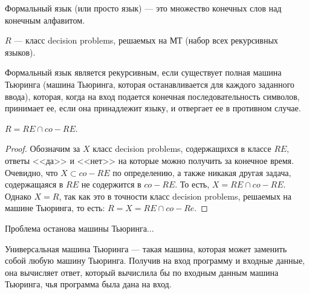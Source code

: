     \begin{Def}
        Формальный язык (или просто язык) --- это множество конечных слов над конечным алфавитом.
    \end{Def}
    \begin{Def}[Класс $R$]
        $R$ --- класс decision problems, решаемых на МТ (набор всех рекурсивных языков). 
    \end{Def}
    \begin{Def} Формальный язык является рекурсивным, если            существует полная машина Тьюринга (машина Тьюринга, которая останавливается для    каждого заданного ввода), которая, когда на вход подается конечная                  последовательность символов, принимает ее, если она принадлежит языку, и отвергает    ее в противном случае. 
    \end{Def}
    \begin{Thm}
        $R = RE \cap co-RE$.
    \end{Thm}
    \begin{proof}
        Обозначим за $X$ класс decision problems, содержащихся в классе $RE$, ответы <<да>> и <<нет>> на которые можно получить за конечное время. Очевидно, что $X \subset co-RE$ по определению, а также никакая другая задача, содержащаяся в $RE$ не содержится в $co-RE$. То есть, $X = RE \cap co-RE$. Однако $X = R$, так как это в точности класс decision problems, решаемых на машине Тьюринга, то есть: $R = X = RE \cap co-Re$.
    \end{proof}
    \begin{Def}
        Проблема останова машины Тьюринга...
    \end{Def}


        
    \begin{Def} Универсальная машина Тьюринга ---        такая машина, которая может заменить собой любую машину Тьюринга. Получив на     вход программу и входные данные, она вычисляет ответ, который вычислила бы по      входным данным машина Тьюринга, чья программа была дана на вход.
    \end{Def}
    \begin{Def} 
    \end{Def}

